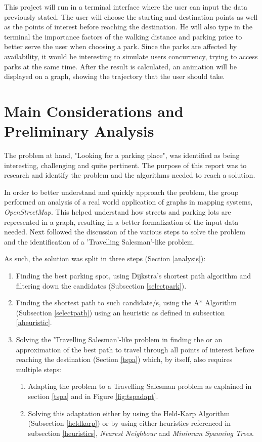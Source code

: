\documentclass[a4paper, 12pt]{report}
\begin{document}
    This project will run in a terminal interface where the user can input the data previously stated. The user will choose the starting and destination points as well as the points of interest before reaching the destination. He will also type in the terminal the importance factors of the walking distance and parking price to better serve the user when choosing a park. Since the parks are affected by availability, it would be interesting to simulate users concurrency, trying to access parks at the same time. After the result is calculated, an animation will be displayed on a graph, showing the trajectory that the user should take.
    
    \pagebreak
     
    \chapter{Main Considerations and Preliminary Analysis} %
    
    The problem at hand, "Looking for a parking place", was identified as being interesting, challenging and quite pertinent. The purpose of this report was to research and identify the problem and the algorithms needed to reach a solution.
    
    In order to better understand and quickly approach the problem, the group performed an analysis of a real world application of graphs in mapping systems, \textit{OpenStreetMap}. This helped understand how streets and parking lots are represented in a graph, resulting in a better formalization of the input data needed. Next followed the discussion of the various steps to solve the problem and the identification of a 'Travelling Salesman'-like problem.
    
    As such, the solution was split in three steps (Section \ref{analysis}): 
    \begin{enumerate}
        \item Finding the best parking spot, using Dijkstra's shortest path algorithm and filtering down the candidates (Subsection \ref{selectpark}). 
        \item Finding the shortest path to such candidate/s, using the A* Algorithm (Subsection \ref{selectpath}) using an heuristic as defined in subsection \ref{aheuristic}.
        \item Solving the 'Travelling Salesman'-like problem in finding the or an approximation of the best path to travel through all points of interest before reaching the destination (Section \ref{tspa}) which, by itself, also requires multiple steps:
        \begin{enumerate}
            \item Adapting the problem to a Travelling Salesman problem as explained in section \ref{tspa} and in Figure \ref{fig:tspadapt}.
            \item Solving this adaptation either by using the Held-Karp Algorithm (Subsection \ref{heldkarp}) or by using either heuristics referenced in subsection \ref{heuristics}, \textit{Nearest Neighbour} and \textit{Minimum Spanning Trees}.
        \end{enumerate}
    \end{enumerate}
    
\end{document}
